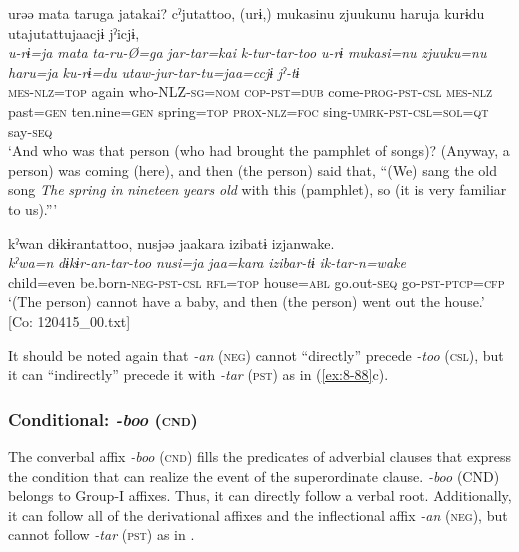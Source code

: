 \ex
{\TM}
\glll  urəə  mata  taruga  jatakai?      cˀjutattoo,  (urɨ,)  mukasinu  {\textbar}zjuukunu      haru{\textbar}ja  kurɨdu  utajutattujaacjɨ  jˀicjɨ,\\
\textit{u-rɨ=ja}  \textit{mata}  \textit{ta-ru-Ø=ga}  \textit{jar-tar=kai}      \textit{k-tur-tar-too}  \textit{u-rɨ}  \textit{mukasi=nu}  \textit{zjuuku=nu}      \textit{haru=ja}  \textit{ku-rɨ=du}  \textit{utaw-jur-tar-tu=jaa=ccjɨ}  \textit{jˀ-tɨ}\\
\textsc{mes}-\textsc{nlz}=\textsc{top}  again  who-NLZ-\textsc{sg}=\textsc{nom}  \textsc{cop}-\textsc{pst}=\textsc{dub}      come-\textsc{prog}-\textsc{pst}-\textsc{csl}  \textsc{mes}-\textsc{nlz}  past=\textsc{gen}  ten.nine=\textsc{gen}  spring=\textsc{top}  \textsc{prox}-\textsc{nlz}=\textsc{foc}  sing-\textsc{umrk}-\textsc{pst}-\textsc{csl}=\textsc{sol}=\textsc{qt}  say-\textsc{seq}\\
\glt ‘And who was that person (who had brought the pamphlet of songs)? (Anyway, a person) was coming (here), and then (the person) said that, “(We) sang the old song \textit{The} \textit{spring} \textit{in} \textit{nineteen} \textit{years} \textit{old} with this (pamphlet), so (it is very familiar to us).”’

\ex
{\TM}
\glll  kˀwan  dɨkɨrantattoo,  nusjəə  jaakara      izibatɨ  izjanwake.\\
\textit{kˀwa=n}  \textit{dɨkɨr-an-tar-too}  \textit{nusi=ja}  \textit{jaa=kara}     \textit{izibar-tɨ}  \textit{ik-tar-n=wake}\\
child=even  be.born-\textsc{neg}-\textsc{pst}-\textsc{csl}  \textsc{rfl}=\textsc{top}  house=\textsc{abl}   go.out-\textsc{seq}  go-\textsc{pst}-\textsc{ptcp}=\textsc{cfp}\\
\glt ‘(The person) cannot have a baby, and then (the person) went out the house.’ [Co: 120415\_00.txt]
\z

It should be noted again that \textit{-an} (\textsc{neg}) cannot “directly” precede \textit{-too} (\textsc{csl}), but it can “indirectly” precede it with \textit{-tar} (\textsc{pst}) as in (\ref{ex:8-88}c).

\subsubsection{Conditional: \textit{-boo} (\textsc{cnd})}

The converbal affix \textit{-boo} (\textsc{cnd}) fills the predicates of adverbial clauses that express the condition that can realize the event of the superordinate clause. \textit{-boo} (CND) belongs to Group-I affixes. Thus, it can directly follow a verbal root. Additionally, it can follow all of the derivational affixes and the inflectional affix \textit{-an} (\textsc{neg}), but cannot follow \textit{-tar} (\textsc{pst}) as in .


